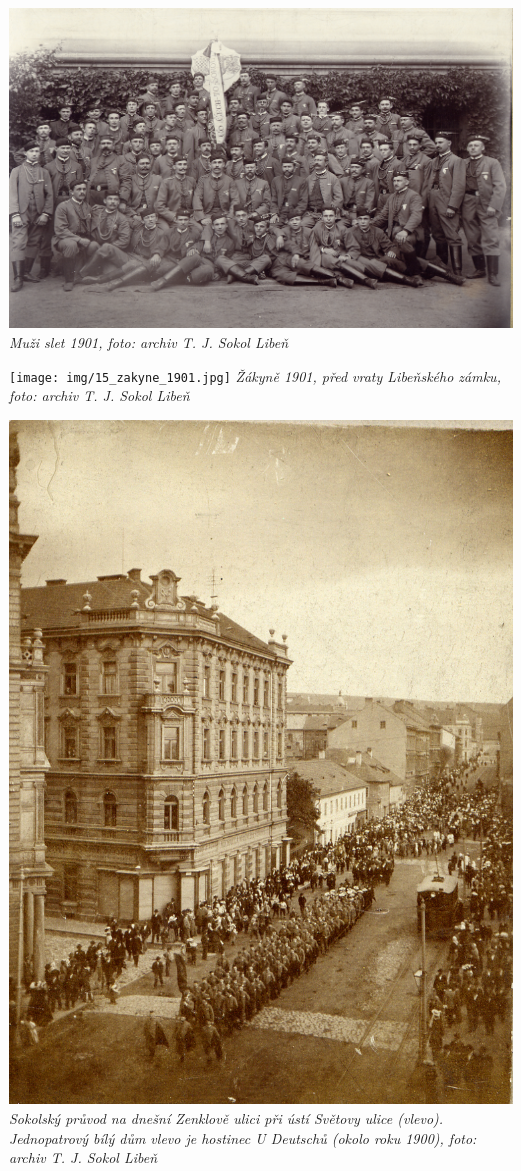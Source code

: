 \documentclass[a5paper, 11pt, twoside]{article}
\begin{document}
\includegraphics[width=\textwidth]{img/14_muzi_slet_1901.jpg}
\textit{Muži slet 1901, foto: archiv T. J. Sokol Libeň}

\texttt{[image: img/15\_zakyne\_1901.jpg]}
\textit{Žákyně 1901, před vraty Libeňského zámku, foto: archiv T. J. Sokol Libeň}

\includegraphics[width=\textwidth]{img/16_pruvod_1900.jpg}
\textit{Sokolský průvod na dnešní Zenklově ulici při ústí Světovy ulice (vlevo). Jednopatrový bílý dům vlevo je hostinec U Deutschů (okolo roku 1900), foto: archiv T. J. Sokol Libeň}
\end{document}
